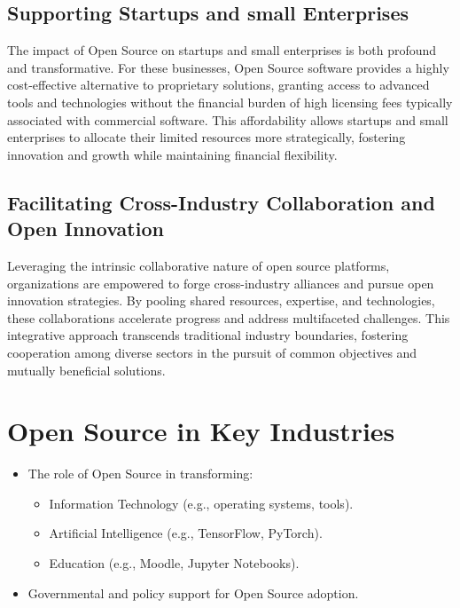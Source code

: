 \subsection{Supporting Startups and small Enterprises}

The impact of Open Source on startups and small enterprises is both profound and transformative. 
For these businesses, Open Source software provides a highly cost-effective alternative to proprietary solutions, 
granting access to advanced tools and technologies without the financial burden of high licensing fees typically associated with commercial software. 
This affordability allows startups and small enterprises to allocate their limited resources more strategically,
fostering innovation and growth while maintaining financial flexibility.

\cite{studiolabs_open_source_startups_2024}

\subsection{Facilitating Cross-Industry Collaboration and Open Innovation}

Leveraging the intrinsic collaborative nature of open source platforms, organizations are empowered to forge cross-industry alliances and pursue open innovation 
strategies. By pooling shared resources, expertise, and technologies, these collaborations accelerate progress and address multifaceted challenges. 
This integrative approach transcends traditional industry boundaries, fostering cooperation among diverse sectors in the pursuit of common objectives and mutually beneficial solutions.



\section{Open Source in Key Industries}

\begin{itemize}
    \item The role of Open Source in transforming:
    \begin{itemize}
        \item Information Technology (e.g., operating systems, tools).
        \item Artificial Intelligence (e.g., TensorFlow, PyTorch).
        \item Education (e.g., Moodle, Jupyter Notebooks).
    \end{itemize}
    \item Governmental and policy support for Open Source adoption.
\end{itemize}


